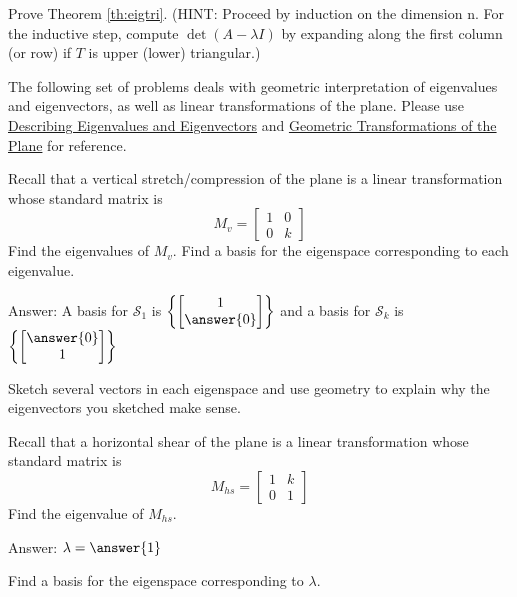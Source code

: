 \documentclass{ximera}
\begin{document}
\begin{problem}\label{prob:eigtri}
Prove Theorem \ref{th:eigtri}.  (HINT:  Proceed by induction on the dimension n.  For the inductive step, compute $\det(A-\lambda I)$ by expanding along the first column (or row) if $T$ is upper (lower) triangular.)
\end{problem}

\begin{problem}
The following set of problems deals with geometric interpretation of eigenvalues and eigenvectors, as well as linear transformations of the plane.  Please use \href{https://ximera.osu.edu/oerlinalg/LinearAlgebra/EIG-0010/main}{Describing Eigenvalues and Eigenvectors} and \href{https://ximera.osu.edu/oerlinalg/LinearAlgebra/LTR-0070/main}{Geometric Transformations of the Plane} for reference.
\begin{problem}\label{prob:eigvectorstransfr2_1}
Recall that a vertical stretch/compression of the plane is a linear transformation whose standard matrix is $$M_v=\begin{bmatrix}1&0\\0&k\end{bmatrix}$$
Find the eigenvalues of $M_v$.  Find a basis for the eigenspace corresponding to each eigenvalue.

Answer:  A basis for $\mathcal{S}_1$ is $\left\{\begin{bmatrix}1\\\answer{0}\end{bmatrix}\right\}$
and a basis for $\mathcal{S}_k$ is $\left\{\begin{bmatrix}\answer{0}\\1\end{bmatrix}\right\}$

Sketch several vectors in each eigenspace and use geometry to explain why the eigenvectors you sketched make sense.
\end{problem}

\begin{problem}\label{prob:eigvectorstransfr2_2}
Recall that a horizontal shear of the plane is a linear transformation whose standard matrix is $$M_{hs}=\begin{bmatrix}1&k\\0&1\end{bmatrix}$$
Find the eigenvalue of $M_{hs}$.  

Answer: $\lambda=\answer{1}$

Find a basis for the eigenspace corresponding to $\lambda$.


\end{problem}
\end{problem}
\end{document}
